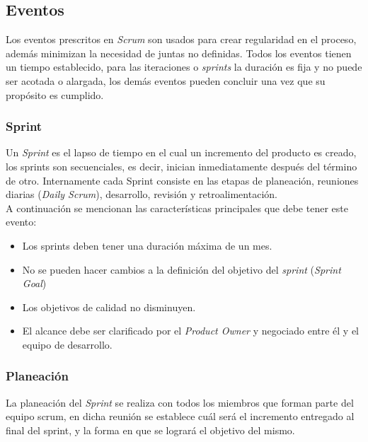 \subsection{Eventos}

 Los eventos prescritos en {\it Scrum} son usados para crear regularidad en el proceso, además
 minimizan la necesidad de juntas no definidas. Todos los eventos tienen un tiempo establecido,
 para las iteraciones o {\it sprints} la duración es fija y no puede ser acotada o alargada, los
 demás eventos pueden concluir una vez que su propósito es cumplido.

\subsubsection{Sprint}

 Un {\it Sprint} es el lapso de tiempo en el cual un incremento del producto es creado, los sprints
 son secuenciales, es decir, inician inmediatamente después del término de otro. Internamente
 cada Sprint consiste en las etapas de planeación, reuniones diarias ({\it Daily Scrum}),
 desarrollo, revisión y retroalimentación.\\

 \noindent A continuación se mencionan las características principales que debe tener este evento:

    \begin{itemize}
    \item Los sprints deben tener una duración máxima de un mes.
    \item No se pueden hacer cambios a la definición del objetivo del {\it sprint} ({\it Sprint Goal})
    \item Los objetivos de calidad no disminuyen.
    \item El alcance debe ser clarificado por el {\it Product Owner} y negociado entre él y el equipo
           de desarrollo.
    \end{itemize}



\subsubsection{Planeación}

 La planeación del {\it Sprint} se realiza con todos los miembros que forman parte del equipo scrum,
 en dicha reunión se establece cuál será el incremento entregado al final del sprint, y la forma
 en que se logrará el objetivo del mismo.\\

